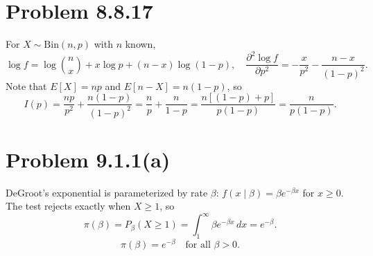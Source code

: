 \documentclass[11pt]{article}
\begin{document}
\section*{Problem 8.8.17}

For $X \sim \mathrm{Bin}(n,p)$ with $n$ known,
\[
\log f = \log\binom{n}{x} + x\log p + (n-x)\log(1-p),
\quad
\frac{\partial^2\log f}{\partial p^2} = -\frac{x}{p^2} - \frac{n-x}{(1-p)^2}.
\]
Note that $E[X] = np$ and $E[n-X] = n(1-p)$, so
\[
I(p) = \frac{np}{p^2} + \frac{n(1-p)}{(1-p)^2}
= \frac{n}{p} + \frac{n}{1-p}
= \frac{n[(1-p) + p]}{p(1-p)}
= \boxed{\frac{n}{p(1-p)}.}
\]

\section*{Problem 9.1.1(a)}

DeGroot's exponential is parameterized by rate $\beta$: $f(x \mid \beta) = \beta e^{-\beta x}$ for $x \ge 0$. The test rejects exactly when $X \ge 1$, so
\[
\pi(\beta) = P_\beta(X \ge 1) = \int_1^\infty \beta e^{-\beta x}\,dx = e^{-\beta}.
\]
\[
\boxed{\pi(\beta) = e^{-\beta} \quad \text{for all } \beta > 0.}
\]
\end{document}
